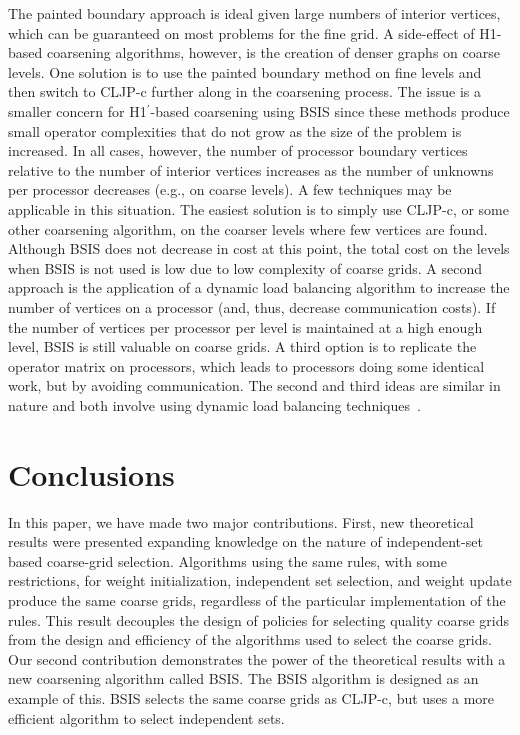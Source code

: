 \documentclass{elsart}
\begin{document}
The painted boundary approach is ideal given large numbers of interior
vertices, which can be guaranteed on most problems for the fine grid.
A side-effect of H1-based coarsening algorithms, however, is the
creation of denser graphs on coarse levels. One solution is to use the
painted boundary method on fine levels and then switch to CLJP-c
further along in the coarsening process. The issue is a smaller
concern for H1$^\prime$-based coarsening using BSIS since these
methods produce small operator complexities that do not grow as the
size of the problem is increased. In all cases, however, the number of
processor boundary vertices relative to the number of interior
vertices increases as the number of unknowns per processor decreases
(e.g., on coarse levels). A few techniques may be applicable in this
situation. The easiest solution is to simply use CLJP-c, or some other
coarsening algorithm, on the coarser levels where few vertices are
found. Although BSIS does not decrease in cost at this point, the
total cost on the levels when BSIS is not used is low due to low
complexity of coarse grids. A second approach is the application of a
dynamic load balancing algorithm to increase the number of vertices on
a processor (and, thus, decrease communication costs). If the number
of vertices per processor per level is maintained at a high enough
level, BSIS is still valuable on coarse grids. A third option is to
replicate the operator matrix on processors, which leads to processors
doing some identical work, but by avoiding communication. The second
and third ideas are similar in nature and both involve using dynamic
load balancing
techniques~\cite{DevineBomanKarypisPP04,CybDLB,deCoughnyLB,SchloegelLB,ZoltanParHyp06ipdps,ZoltanParHypRepart07}.

\section{Conclusions}
\label{sec:conclusions}
In this paper, we have made two major contributions. First, new
theoretical results were presented expanding knowledge on the nature
of independent-set based coarse-grid selection. Algorithms using the
same rules, with some restrictions, for weight initialization,
independent set selection, and weight update produce the same coarse
grids, regardless of the particular implementation of the rules. This
result decouples the design of policies for selecting quality coarse
grids from the design and efficiency of the algorithms used to select
the coarse grids. Our second contribution demonstrates the power of
the theoretical results with a new coarsening algorithm called
BSIS. The BSIS algorithm is designed as an example of this. BSIS
selects the same coarse grids as CLJP-c, but uses a more efficient
algorithm to select independent sets.



\end{document}
